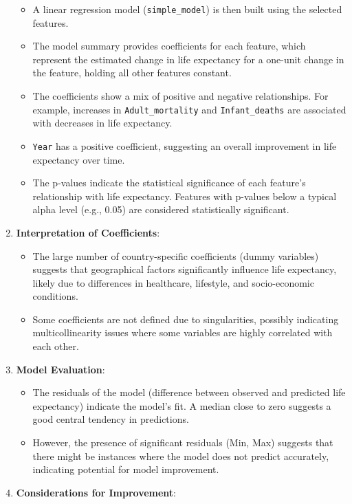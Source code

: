 \documentclass[
]{article}
\providecommand{\tightlist}{%
  \setlength{\itemsep}{0pt}\setlength{\parskip}{0pt}}
\begin{document}
\begin{enumerate}
  \begin{itemize}
  \tightlist
  \item
    A linear regression model (\texttt{simple\_model}) is then built
    using the selected features.
  \item
    The model summary provides coefficients for each feature, which
    represent the estimated change in life expectancy for a one-unit
    change in the feature, holding all other features constant.
  \item
    The coefficients show a mix of positive and negative relationships.
    For example, increases in \texttt{Adult\_mortality} and
    \texttt{Infant\_deaths} are associated with decreases in life
    expectancy.
  \item
    \texttt{Year} has a positive coefficient, suggesting an overall
    improvement in life expectancy over time.
  \item
    The p-values indicate the statistical significance of each feature's
    relationship with life expectancy. Features with p-values below a
    typical alpha level (e.g., 0.05) are considered statistically
    significant.
  \end{itemize}
\item
  \textbf{Interpretation of Coefficients}:

  \begin{itemize}
  \tightlist
  \item
    The large number of country-specific coefficients (dummy variables)
    suggests that geographical factors significantly influence life
    expectancy, likely due to differences in healthcare, lifestyle, and
    socio-economic conditions.
  \item
    Some coefficients are not defined due to singularities, possibly
    indicating multicollinearity issues where some variables are highly
    correlated with each other.
  \end{itemize}
\item
  \textbf{Model Evaluation}:

  \begin{itemize}
  \tightlist
  \item
    The residuals of the model (difference between observed and
    predicted life expectancy) indicate the model's fit. A median close
    to zero suggests a good central tendency in predictions.
  \item
    However, the presence of significant residuals (Min, Max) suggests
    that there might be instances where the model does not predict
    accurately, indicating potential for model improvement.
  \end{itemize}
\item
  \textbf{Considerations for Improvement}:


\end{enumerate}
\end{document}
